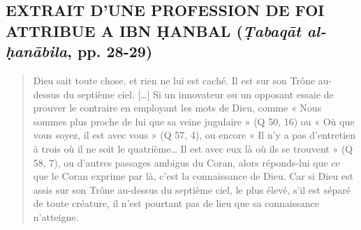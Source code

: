 \subsection{EXTRAIT D'UNE PROFESSION DE FOI ATTRIBUE A IBN ḤANBAL
(\emph{Ṭabaqāt al-ḥanābila}, pp. 28-29)}
\begin{quote}
    Dieu sait toute chose, et rien ne lui est caché. Il est sur son Trône
au-dessus du septième ciel. {[}\ldots{]} Si un
innovateur ou un opposant essaie de prouver le
contraire en employant les mots de Dieu, comme « Nous sommes plus proche
de lui que sa veine jugulaire » (Q 50, 16) ou « Où que vous soyez, il
est avec vous » (Q 57, 4), ou encore « Il n'y a pas d'entretien à trois
où il ne soit le quatrième\ldots{} Il est avec eux là où ils se trouvent
» (Q 58, 7), ou d'autres passages ambigus du Coran, alors réponds-lui
que ce que le Coran exprime par là, c'est la connaissance de Dieu. Car
si Dieu est assis sur son Trône au-dessus du septième ciel, le plus
élevé, s'il est séparé de toute créature, il n'est pourtant pas de lieu
que sa connaissance n'atteigne.

\end{quote}
